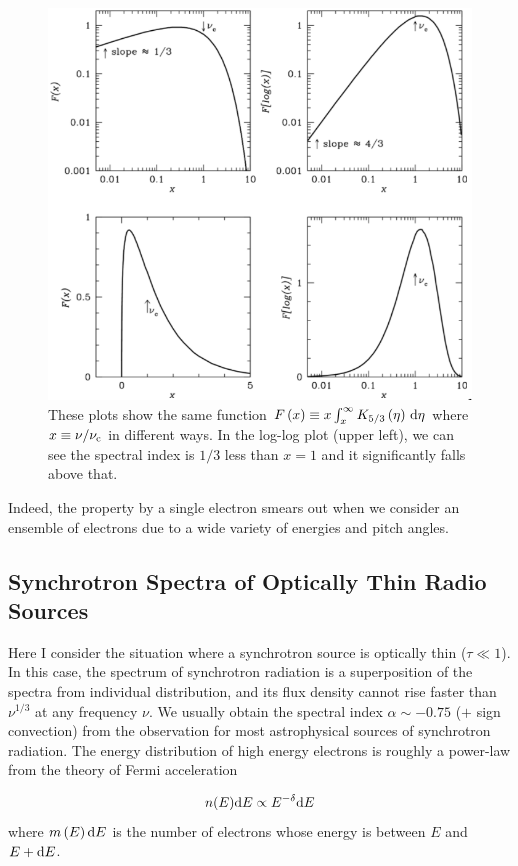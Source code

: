 \begin{figure}[htbp]
	\centering
	\includegraphics[width=.7\linewidth]{Chapter_2/Figures/NRAO_radio5n6.png}
    \caption[The synchrotron spectrum of a single electron]{\label{fig:nrao_radio5n6}
        These plots show the same function $F\left(x\right) \equiv x\int^{\infty}_x K_{5/3}\left(\eta\right)\,\mathrm{d}\eta$ where $x \equiv \nu / \nu_{\mathrm{c}}$ in different ways.
        In the log-log plot (upper left), we can see the spectral index is $1/3$ less than $x=1$ and it significantly falls above that.
    }
\end{figure}

Indeed, the property by a single electron smears out when we consider an ensemble of electrons due to a wide variety of energies and pitch angles.


\subsection{Synchrotron Spectra of Optically Thin Radio Sources}\label{subsec:synchrotronspectra_opticallythin}
Here I consider the situation where a synchrotron source is optically thin ($\tau \ll 1$).
In this case, the spectrum of synchrotron radiation is a superposition of the spectra from individual distribution, and its flux density cannot rise faster than $\nu^{1/3}$ at any frequency $\nu$.
We usually obtain the spectral index $\alpha\sim-0.75$ ($+$ sign convection) from the observation for most astrophysical sources of synchrotron radiation.
The energy distribution of high energy electrons is roughly a power-law from the theory of Fermi acceleration

\begin{equation}\label{eq:essential_radio5n70}
    n(E) \mathrm{d} E \propto E^{-\delta} \mathrm{d} E
\end{equation}
where $m\left(E\right)\mathrm{d} E$ is the number of electrons whose energy is between $E$ and $E+\mathrm{d} E$.

